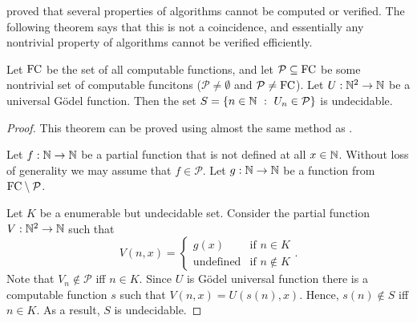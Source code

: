 proved that several properties of algorithms cannot be computed or verified.
The following theorem says that this is not a coincidence, and essentially any 
nontrivial property of algorithms cannot be verified efficiently.
\begin{theorem}
  Let $\mathrm{FC}$ be the set of all computable functions, and let
  $\mathcal{P} \subseteq \mathrm{FC}$ be some nontrivial set of computable
  funcitons ($\mathcal{P} \neq \emptyset$ and $\mathcal{P} \neq \mathrm{FC}$).
  Let $U : {\mathbb{N}}^2 \to {\mathbb{N}}$ be a universal G\"odel function. Then the set 
  $S = \set[U_n \in \mathcal{P}]{n \in \N}$ is undecidable.
\end{theorem}
\begin{proof}
  This theorem can be proved using almost the same method as
  .

  Let $f : {\mathbb{N}} \to {\mathbb{N}}$ be a partial function that is not defined at all $x \in
  {\mathbb{N}}$. Without loss of generality we may assume that $f \in \mathcal{P}$.
  Let $g : {\mathbb{N}} \to {\mathbb{N}}$ be a function from $\mathrm{FC} \setminus \mathcal{P}$.

  Let $K$ be a enumerable but undecidable set.
  Consider the partial function $V : {\mathbb{N}}^2 \to {\mathbb{N}}$ such that 
  \[
    V(n, x) = 
    \begin{cases}
      g(x) & \text{if } n \in K \\
      \text{undefined} & \text{if } n \not\in K 
    \end{cases}.
  \]
  Note that $V_n \not\in \mathcal{P}$ iff $n \in K$. 
  Since $U$ is G\"odel universal function there is a computable function $s$
  such that $V(n, x) = U(s(n), x)$. Hence, $s(n) \not\in S$ iff $n \in K$.
  As a result, $S$ is undecidable.
\end{proof}

